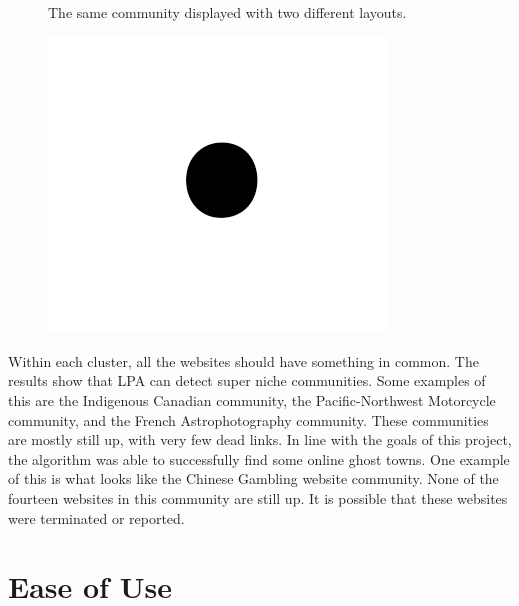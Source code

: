 \documentclass[conference]{IEEEtran}
\begin{document}
\begin{figure}[htbp]
    \centering
    \\
    \caption{The same community displayed with two different layouts.}
    \label{fig}
    
\centerline{\includegraphics{fig1.png}}
\caption{}
\label{Figure X2}
\end{figure}

Within each cluster, all the websites should have something in common. The results show that LPA can detect super niche communities. Some examples of this are the Indigenous Canadian community, the Pacific-Northwest Motorcycle community, and the French Astrophotography community. These communities are mostly still up, with very few dead links. In line with the goals of this project, the algorithm was able to successfully find some online ghost towns. One example of this is what looks like the Chinese Gambling website community. None of the fourteen websites in this community are still up. It is possible that these websites were terminated or reported.



\section{Ease of Use}
\end{document}
